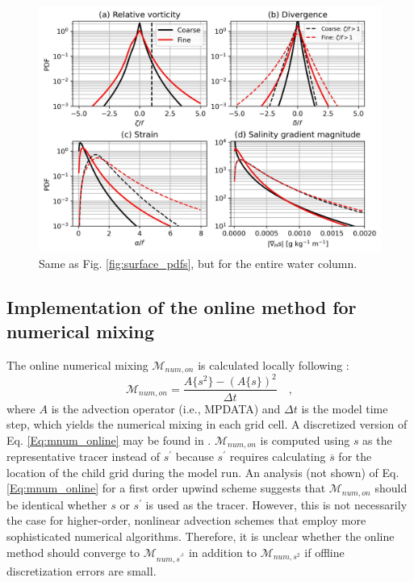 \begin{figure}[ht] 
 \centerline{\includegraphics[width = \linewidth]{figures/james_2023/Figure4_whole_pdfs.jpg}}
  \caption{Same as Fig. \ref{fig:surface_pdfs}, but for the entire water column.}
  \label{fig:whole_pdfs}
\end{figure}

\subsection{Implementation of the online method for numerical mixing}

The online numerical mixing $\mathcal{M}_{num, on}$ is calculated locally following \citet{Burchard_2008}:   
\begin{equation}\label{Eq:mnum_online}
    \mathcal{M}_{num, on} = \frac{A\{ s^2 \}-\left(A \{s \} \right)^2}{\Delta t} \quad ,
\end{equation}
where $A$ is the advection operator (i.e., MPDATA) and $\Delta t$ is the model time step, which yields the numerical mixing in each grid cell. A discretized version of Eq. \ref{Eq:mnum_online} may be found in \citet{Burchard_2008}. $\mathcal{M}_{num, on}$ is computed using $s$ as the representative tracer instead of $s^{\prime}$ because $s^{\prime}$ requires calculating $\overline{s}$ for the location of the child grid during the model run. An analysis (not shown) of Eq. \ref{Eq:mnum_online} for a first order upwind scheme suggests that $\mathcal{M}_{num,on}$ should be identical whether $s$ or $s^\prime$ is used as the tracer. However, this is not necessarily the case for higher-order, nonlinear advection schemes that employ more sophisticated numerical algorithms. Therefore, it is unclear whether the online method should converge to $\mathcal{M}_{num, s^{\prime^2}}$ in addition to $\mathcal{M}_{num, s^2}$ if offline discretization errors are small. 

